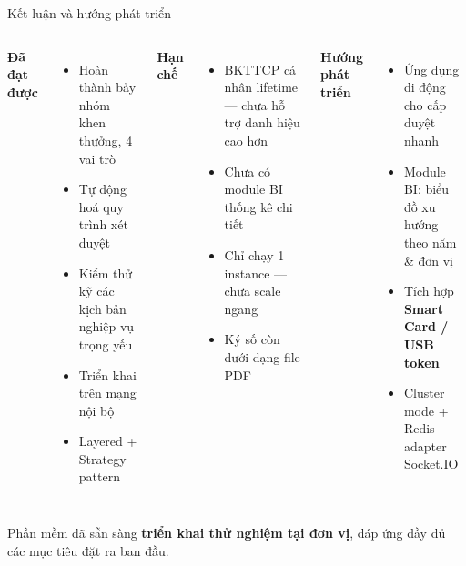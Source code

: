 \documentclass[aspectratio=43,xcolor=table]{beamer}
\newcommand{\highlight}[1]{\textcolor{hustred}{\textbf{#1}}}
\begin{document}
\begin{frame}{Kết luận và hướng phát triển}
  \begin{columns}[T,onlytextwidth]
    \textbf{\textcolor{hustred}{Đã đạt được}}
    \begin{itemize}\scriptsize
      \item Hoàn thành bảy nhóm khen thưởng, 4 vai trò
      \item Tự động hoá quy trình xét duyệt
      \item Kiểm thử kỹ các kịch bản nghiệp vụ trọng yếu
      \item Triển khai trên mạng nội bộ
      \item Layered + Strategy pattern
    \end{itemize}

    \textbf{\textcolor{hustred}{Hạn chế}}
    \begin{itemize}\scriptsize
      \item BKTTCP cá nhân lifetime --- chưa hỗ trợ danh hiệu cao hơn
      \item Chưa có module BI thống kê chi tiết
      \item Chỉ chạy 1 instance --- chưa scale ngang
      \item Ký số còn dưới dạng file PDF
    \end{itemize}

    \textbf{\textcolor{hustred}{Hướng phát triển}}
    \begin{itemize}\scriptsize
      \item Ứng dụng di động cho cấp duyệt nhanh
      \item Module BI: biểu đồ xu hướng theo năm \& đơn vị
      \item Tích hợp \textbf{Smart Card / USB token}
      \item Cluster mode + Redis adapter Socket.IO
    \end{itemize}
  \end{columns}

  \vspace{0.3cm}
  \begin{block}{}
    \centering\small Phần mềm đã sẵn sàng \highlight{triển khai thử nghiệm tại đơn vị}, đáp ứng đầy đủ các mục tiêu đặt ra ban đầu.
  \end{block}
\end{frame}
\end{document}
